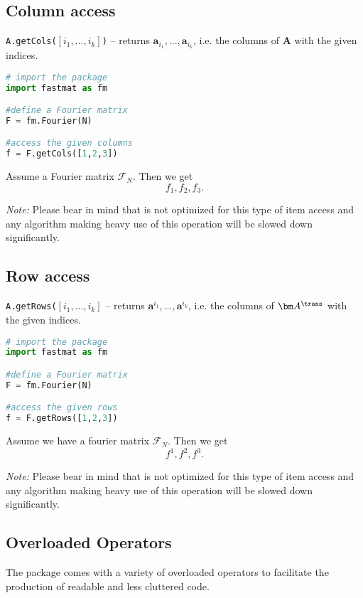 \subsection{Column access} 
\texttt{A.getCols($[i_1,\dots,i_k]$)} -- returns $\bm a_{i_1}, ... , \bm a_{i_k}$, i.e. the columns of $\bm A$ with the given indices.

\begin{snippet}
\begin{lstlisting}[language=Python]
# import the package
import fastmat as fm

#define a Fourier matrix
F = fm.Fourier(N)

#access the given columns
f = F.getCols([1,2,3])
\end{lstlisting}

Assume a Fourier matrix $\bm{\mathcal{F}}_N$. Then we get
	\[f_1,f_2,f_3.\]
\end{snippet}

\textit{Note:} Please bear in mind that \fm{} is not optimized for this type of item access and any algorithm making heavy use of this operation will be slowed down significantly.
%
%
%
\subsection{Row access} 
\texttt{A.getRows($[i_1,\dots,i_k]$} -- returns $\bm a^{i_1}, ... , \bm a^{i_k}$, i.e. the columns of $\bm A^\trans$ with the given indices.

\begin{snippet}
\begin{lstlisting}[language=Python]
# import the package
import fastmat as fm

#define a Fourier matrix
F = fm.Fourier(N)

#access the given rows
f = F.getRows([1,2,3])
\end{lstlisting}

Assume we have a fourier matrix $\bm{\mathcal{F}}_N$. Then we get
	\[f^1,f^2,f^3.\]
\end{snippet}

\textit{Note:} Please bear in mind that \fm{} is not optimized for this type of item access and any algorithm making heavy use of this operation will be slowed down significantly.
%
%
%
\subsection{Overloaded Operators}
The \fm{} package comes with a variety of overloaded operators to facilitate the production of readable and less cluttered code.

